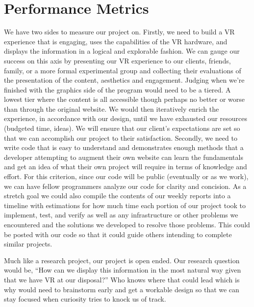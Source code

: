 \documentclass[draftclsnofoot,onecolumn]{IEEEtran}
\begin{document}
\section{Performance Metrics}
\par We have two sides to measure our project on.  Firstly, we need to build a VR experience that is engaging, uses the capabilities of the VR hardware, and displays the information in a logical and explorable fashion.  We can gauge our success on this axis by presenting our VR experience to our clients, friends, family, or a more formal experimental group and collecting their evaluations of the presentation of the content, aesthetics and engagement.  Judging when we’re finished with the graphics side of the program would need to be a tiered.  A lowest tier where the content is all accessible though perhaps no better or worse than through the original website.  We would then iteratively enrich the experience, in accordance with our design, until we have exhausted our resources (budgeted time, ideas).  We will ensure that our client’s expectations are set so that we can accomplish our project to their satisfaction.  Secondly, we need to write code that is easy to understand and demonstrates enough methods that a developer attempting to augment their own website can learn the fundamentals and get an idea of what their own project will require in terms of knowledge and effort.  For this criterion, since our code will be public (eventually or as we work), we can have fellow programmers analyze our code for clarity and concision.  As a stretch goal we could also compile the contents of our weekly reports into a timeline with estimations for how much time each portion of our project took to implement, test, and verify as well as any infrastructure or other problems we encountered and the solutions we developed to resolve those problems.  This could be posted with our code so that it could guide others intending to complete similar projects.

\par Much like a research project, our project is open ended.  Our research question would be, “How can we display this information in the most natural way given that we have VR at our disposal?”  Who knows where that could lead which is why would need to brainstorm early and get a workable design so that we can stay focused when curiosity tries to knock us of track.
\end{document}
